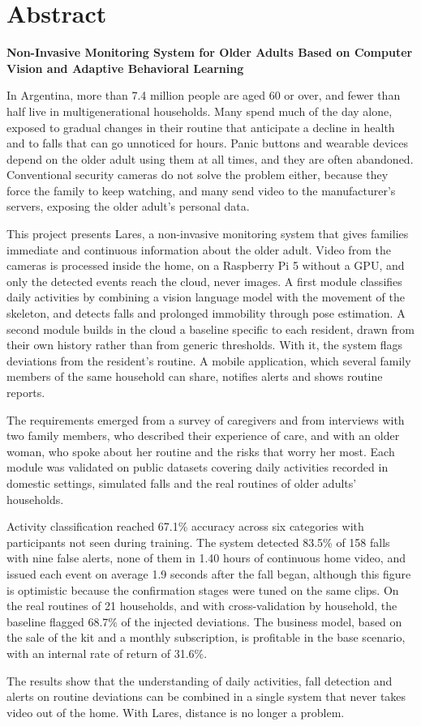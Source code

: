 \chapter*{Abstract}

\begin{center}
\textbf{Non-Invasive Monitoring System for Older Adults Based on Computer Vision and Adaptive Behavioral Learning}
\end{center}

In Argentina, more than 7.4 million people are aged 60 or over, and fewer than half live in multigenerational households.
Many spend much of the day alone, exposed to gradual changes in their routine that anticipate a decline in health and to falls that can go unnoticed for hours.
Panic buttons and wearable devices depend on the older adult using them at all times, and they are often abandoned.
Conventional security cameras do not solve the problem either, because they force the family to keep watching, and many send video to the manufacturer's servers, exposing the older adult's personal data.

This project presents Lares, a non-invasive monitoring system that gives families immediate and continuous information about the older adult.
Video from the cameras is processed inside the home, on a Raspberry Pi 5 without a GPU, and only the detected events reach the cloud, never images.
A first module classifies daily activities by combining a vision language model with the movement of the skeleton, and detects falls and prolonged immobility through pose estimation.
A second module builds in the cloud a baseline specific to each resident, drawn from their own history rather than from generic thresholds.
With it, the system flags deviations from the resident's routine.
A mobile application, which several family members of the same household can share, notifies alerts and shows routine reports.

The requirements emerged from a survey of caregivers and from interviews with two family members, who described their experience of care, and with an older woman, who spoke about her routine and the risks that worry her most.
Each module was validated on public datasets covering daily activities recorded in domestic settings, simulated falls and the real routines of older adults' households.

Activity classification reached 67.1\% accuracy across six categories with participants not seen during training.
The system detected 83.5\% of 158 falls with nine false alerts, none of them in 1.40 hours of continuous home video, and issued each event on average 1.9 seconds after the fall began, although this figure is optimistic because the confirmation stages were tuned on the same clips.
On the real routines of 21 households, and with cross-validation by household, the baseline flagged 68.7\% of the injected deviations.
The business model, based on the sale of the kit and a monthly subscription, is profitable in the base scenario, with an internal rate of return of 31.6\%.

The results show that the understanding of daily activities, fall detection and alerts on routine deviations can be combined in a single system that never takes video out of the home.
With Lares, distance is no longer a problem.
